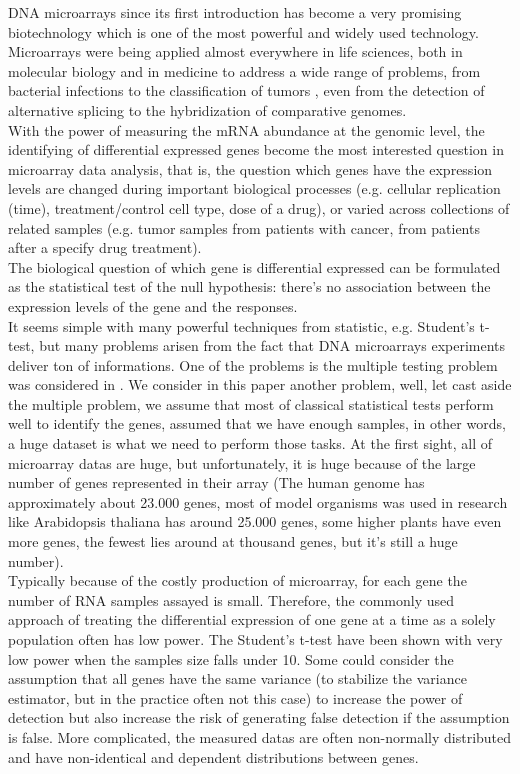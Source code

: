 DNA microarrays since its first introduction has become a very promising biotechnology which is one of the most powerful and widely used technology. Microarrays were being applied almost everywhere in life sciences, both in molecular biology and in medicine to address a wide range of problems, from bacterial infections to the classification of tumors \citep{Boldrick:2002p2425, Golub:1999p14}, even from the detection of alternative splicing to the hybridization of comparative genomes. 
\\
With the power of measuring the mRNA abundance at the genomic level, the identifying of differential expressed genes become the most interested question in microarray data analysis, that is, the question which genes have the expression levels are changed during important biological processes (e.g. cellular replication (time), treatment/control cell type, dose of a drug), or varied across collections of related samples (e.g. tumor samples from patients with cancer, from patients after a specify drug treatment).
\\
The biological question of which gene is differential expressed can be formulated as the statistical test of the null hypothesis: there's no association between the expression levels of the gene and the responses.
\\
It seems simple with many powerful techniques from statistic, e.g. Student's t-test, but many problems arisen from the fact that DNA microarrays experiments deliver ton of informations. One of the problems is the multiple testing problem was considered in \citep{Dudoit:2003p3}. We consider in this paper another problem, well, let cast aside the multiple problem, we assume that most of classical statistical tests perform well to identify the genes, assumed that we have enough samples, in other words, a huge dataset is what we need to perform those tasks.
At the first sight, all of microarray datas are huge, but unfortunately, it is huge because of the large number of genes represented in their array (The human genome has approximately about 23.000 genes, most of model organisms was used in research like Arabidopsis thaliana has around 25.000 genes, some higher plants have even more genes, the fewest lies around at thousand genes, but it's still a huge number).
\\
Typically because of the costly production of microarray, for each gene the number of RNA samples assayed is small. Therefore, the commonly used approach of treating the differential expression of one gene at a time as a solely population often has low power. The Student's t-test have been shown with very low power when the samples size falls under 10. Some could consider the assumption that all genes have the same variance (to stabilize the variance estimator, but in the practice often not this case) to increase the power of detection but also increase the risk of generating false detection if the assumption is false. More complicated, the measured datas are often non-normally distributed and have non-identical and dependent distributions between genes. 

